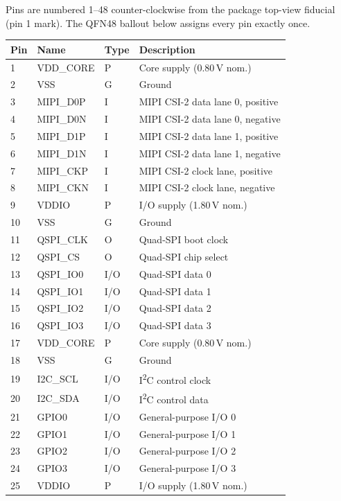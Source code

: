 \documentclass{anvil-datasheet}
\begin{document}
Pins are numbered 1--48 counter-clockwise from the package top-view fiducial
(pin 1 mark). The QFN48 ballout below assigns every pin exactly once.

\begin{specbox}
\begin{tabularx}{\textwidth}{@{} l l l X @{}}
\toprule
\textbf{Pin} & \textbf{Name} & \textbf{Type} & \textbf{Description} \\
\midrule
1 & VDD\_CORE & P & Core supply (0.80\,V nom.) \\
2 & VSS & G & Ground \\
3 & MIPI\_D0P & I & MIPI CSI-2 data lane 0, positive \\
4 & MIPI\_D0N & I & MIPI CSI-2 data lane 0, negative \\
5 & MIPI\_D1P & I & MIPI CSI-2 data lane 1, positive \\
6 & MIPI\_D1N & I & MIPI CSI-2 data lane 1, negative \\
7 & MIPI\_CKP & I & MIPI CSI-2 clock lane, positive \\
8 & MIPI\_CKN & I & MIPI CSI-2 clock lane, negative \\
9 & VDDIO & P & I/O supply (1.80\,V nom.) \\
10 & VSS & G & Ground \\
11 & QSPI\_CLK & O & Quad-SPI boot clock \\
12 & QSPI\_CS & O & Quad-SPI chip select \\
13 & QSPI\_IO0 & I/O & Quad-SPI data 0 \\
14 & QSPI\_IO1 & I/O & Quad-SPI data 1 \\
15 & QSPI\_IO2 & I/O & Quad-SPI data 2 \\
16 & QSPI\_IO3 & I/O & Quad-SPI data 3 \\
17 & VDD\_CORE & P & Core supply (0.80\,V nom.) \\
18 & VSS & G & Ground \\
19 & I2C\_SCL & I/O & I\textsuperscript{2}C control clock \\
20 & I2C\_SDA & I/O & I\textsuperscript{2}C control data \\
21 & GPIO0 & I/O & General-purpose I/O 0 \\
22 & GPIO1 & I/O & General-purpose I/O 1 \\
23 & GPIO2 & I/O & General-purpose I/O 2 \\
24 & GPIO3 & I/O & General-purpose I/O 3 \\
25 & VDDIO & P & I/O supply (1.80\,V nom.) \\

\end{tabularx}
\end{specbox}
\end{document}

